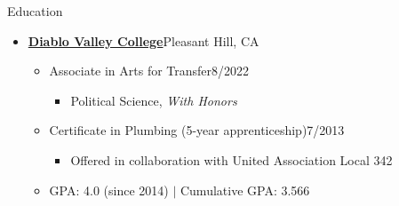 \documentclass[12pt]{resume} %
\begin{document}
\begin{rSection}{Education}
\begin{itemize}[leftmargin=0em, itemsep=0pt]
\begin{itemize}[leftmargin=1em, itemsep=0pt]
    \item[] Associate in Arts for Transfer\hfill{}8/2022
    \begin{itemize}[leftmargin=1em, itemsep=0pt]
        \item[] Sociology, \textit{With Honors}
        \item[] Liberal Arts: Behavioral Science \& Social Science, \textit{With Honors}
    \end{itemize}
    \item[] \href{https://www.losmedanos.edu/honors/prog.aspx}{Honors Scholar} (the college’s highest distinction)
   \item[] GPA: 4.0 (since 2014) $|$ Cumulative GPA: 3.874
\end{itemize}
\vspace{12pt}
\item[] \textbf{\href{https://www.dvc.edu/}{Diablo Valley College}}\hfill{}Pleasant Hill, CA
\begin{itemize}[leftmargin=1em, itemsep=0pt]
    \item[] Associate in Arts for Transfer\hfill{}8/2022
    \begin{itemize}[leftmargin=1em, itemsep=0pt]
        \item[] Political Science, \textit{With Honors}
    \end{itemize}
    \item[] Certificate in Plumbing (5-year apprenticeship)\hfill{}7/2013
    \begin{itemize}[leftmargin=1em, itemsep=0pt]
        \item[] Offered in collaboration with United Association Local 342
    \end{itemize}
    \item[] GPA: 4.0 (since 2014) $|$ Cumulative GPA: 3.566
\end{itemize}
\end{itemize}

\end{rSection}
\end{document}
